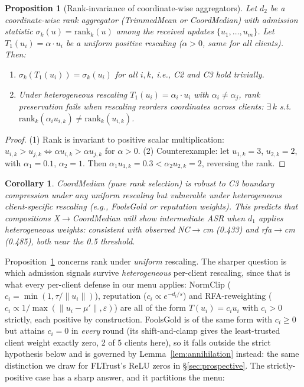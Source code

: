 \documentclass{article}
\newtheorem{proposition}[theorem]{Proposition}
\newtheorem{corollary}{Corollary}
\begin{document}
\begin{proposition}[Rank-invariance of coordinate-wise aggregators]
\label{prop:rank_invariance}
Let $d_2$ be a coordinate-wise rank aggregator (TrimmedMean or CoordMedian) with admission statistic $\sigma_k(u) = \mathrm{rank}_k(u)$ among the received updates $\{u_1, \ldots, u_m\}$. Let $T_1(u_i) = \alpha \cdot u_i$ be a \emph{uniform} positive rescaling ($\alpha > 0$, same for all clients). Then:
\begin{enumerate}[noitemsep,topsep=2pt]
\item $\sigma_k(T_1(u_i)) = \sigma_k(u_i)$ for all $i, k$, i.e., C2 and C3 hold trivially.
\item Under \emph{heterogeneous} rescaling $T_1(u_i) = \alpha_i \cdot u_i$ with $\alpha_i \neq \alpha_j$, rank preservation fails when rescaling reorders coordinates across clients: $\exists\, k$ s.t.\ $\mathrm{rank}_k(\alpha_i u_{i,k}) \neq \mathrm{rank}_k(u_{i,k})$.
\end{enumerate}
\end{proposition}
\begin{proof}
(1) Rank is invariant to positive scalar multiplication: $u_{i,k} > u_{j,k} \iff \alpha u_{i,k} > \alpha u_{j,k}$ for $\alpha > 0$. (2) Counterexample: let $u_{1,k} = 3$, $u_{2,k} = 2$, with $\alpha_1 = 0.1$, $\alpha_2 = 1$. Then $\alpha_1 u_{1,k} = 0.3 < \alpha_2 u_{2,k} = 2$, reversing the rank.
\end{proof}

\begin{corollary}
\label{cor:cm_robust}
CoordMedian (pure rank selection) is robust to C3 boundary compression under any uniform rescaling but vulnerable under heterogeneous client-specific rescaling (e.g., FoolsGold or reputation weights). This predicts that compositions X$\to$CoordMedian will show \emph{intermediate} ASR when $d_1$ applies heterogeneous weights: consistent with observed NC$\to$cm (0.433) and rfa$\to$cm (0.485), both near the 0.5 threshold.
\end{corollary}

Proposition~\ref{prop:rank_invariance} concerns rank under \emph{uniform} rescaling. The sharper question is which admission signals survive \emph{heterogeneous} per-client rescaling, since that is what every per-client defense in our menu applies: NormClip ($c_i = \min(1,\tau/\|u_i\|)$), reputation ($c_i \propto e^{-d_i/s}$) and RFA-reweighting ($c_i \propto 1/\max(\|u_i-\mu'\|,\varepsilon)$) are all of the form $T(u_i) = c_i u_i$ with $c_i > 0$ strictly, each positive by construction. FoolsGold is of the same form with $c_i \ge 0$ but attains $c_i = 0$ in \emph{every} round (its shift-and-clamp gives the least-trusted client weight exactly zero, 2 of 5 clients here), so it falls outside the strict hypothesis below and is governed by Lemma~\ref{lem:annihilation} instead: the same distinction we draw for FLTrust's ReLU zeros in §\ref{sec:prospective}. The strictly-positive case has a sharp answer, and it partitions the menu:
\end{document}
